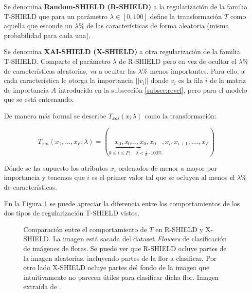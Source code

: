 Se denomina \textbf{Random-SHIELD (R-SHIELD)} a la regularización de la familia T-SHIELD que para un parámetro $\lambda \in [0,100]$ define la transformación $T$ como aquella que esconde un $\lambda\%$ de las características de forma aleatoria (misma probabilidad para cada una).

Se denomina \textbf{XAI-SHIELD (X-SHIELD)} a otra regularización de la familia T-SHIELD. Comparte el parámetro $\lambda$ de R-SHIELD pero en vez de ocultar el $\lambda\%$ de características aleatorias, va a ocultar las $\lambda\%$ menos importantes. Para ello, a cada característica le otorga la importancia $||v_i||$ donde $v_i$ es la fila $i$ de la matriz de importancia $A$ introducida en la subsección \ref{subsec:revel}, pero para el modelo que se está entrenando.

De manera más formal se describe $T_{xai}(x;\lambda)$ como la transformación:

\begin{equation}
T_{xai}(x_1,...,x_F; \lambda) = (\underbrace{x_0,x_0...,x_0,x_0}_{0 \leq i\leq F : \quad \lambda < \frac{i}{n}\cdot 100\%},x_i,x_{i+1},....,x_F)
\end{equation}

Dónde se ha supuesto los atributos $x_i$ ordenados de menor a mayor por importancia y tenemos que $i$ es el primer valor tal que se ocluyen al menos el $\lambda \%$ de características.

En la Figura \ref{fig:rshield_vs_xshield} se puede apreciar la diferencia entre los comportamientos de los dos tipos de regularización T-SHIELD vistos.

\begin{figure}[h]
\noindent
{}
\caption{ Comparación entre el comportamiento de $T$ en R-SHIELD y X-SHIELD. La imagen está sacada del dataset \textit{Flowers} de clasificación de imágenes de flores. Se puede ver que R-SHIELD ocluye partes de la imagen aleatorias, incluyendo partes de la flor a clasificar. Por otro lado X-SHIELD ocluye partes del fondo de la imagen que intuitivamente no parecen útiles para clasificar dicha flor. Imagen extraída de \cite{REVEL}.}
\label{fig:rshield_vs_xshield}
\end{figure}



